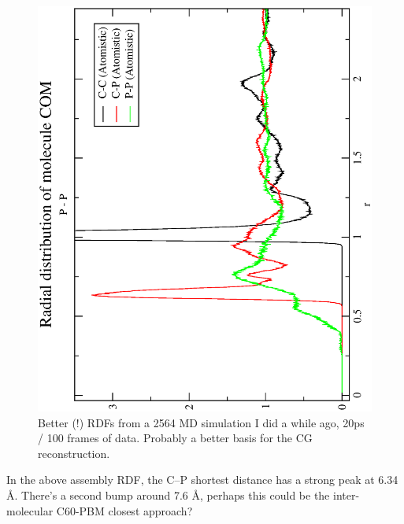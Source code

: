 \documentclass[hyperref]{labbook}
\begin{document}
\begin{figure}[h!]
\centering
\includegraphics[width=0.8\columnwidth]{./figs/RDFs_2564_20ps_MD_atomistic_PCBM}
\caption{\label{RDFs_2564_20ps_MD_atomistic_PCBM}
Better (!) RDFs from a 2564 MD simulation I did a while ago, 20ps / 100 frames of data. Probably a better basis for the CG reconstruction.
}
\end{figure}

In the above assembly RDF, the C--P shortest distance has a strong peak at 6.34
\AA. There's a second bump around 7.6 \AA, perhaps this could be the
inter-molecular C60-PBM closest approach?
\end{document}
